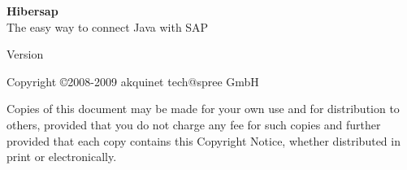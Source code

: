 \begin{titlepage}
	 \HRule 
	\begin{flushleft} 
		\Huge {\bf Hibersap} \\
		\LARGE The easy way to connect Java with SAP \\
	\end{flushleft}
	\HRule {} 
	\begin{center} 
		\large Version \HibersapVersion 
	\end{center}
	\begin{center}
		\large Copyright \copyright 2008-2009 akquinet tech@spree GmbH 
	\end{center}
	\begin{center} 
		Copies of this document may be made for your own use and for distribution to others, 
		provided that you do not charge any fee for such copies and further provided that each 
		copy contains this Copyright Notice, whether distributed in print or
		electronically.
	\end{center}
\end{titlepage}
